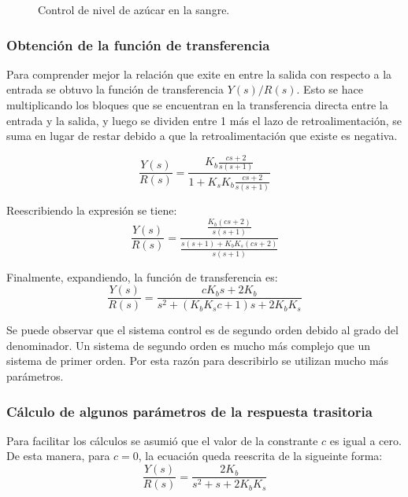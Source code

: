 \documentclass[journal]{IEEEtran}
\begin{document}
\begin{figure}[h]
\caption{Control de nivel de 
az\'ucar en la sangre.}
\label{bloqDiag}
\end{figure}

\subsubsection*{Obtenci\'on de la funci\'on de transferencia}
Para comprender mejor la relaci\'on que exite en entre la
salida con
respecto a la entrada se obtuvo la funci\'on de 
transferencia $Y(s)/R(s)$. Esto se hace multiplicando los
bloques que se encuentran en la transferencia directa entre
la entrada y la salida, y luego se dividen entre 1 m\'as el 
lazo de retroalimentaci\'on, se suma en lugar de restar 
debido a que la retroalimentaci\'on que existe es 
negativa.

\begin{displaymath}
\frac{Y(s)}{R(s)} = \frac{K_b \frac{cs + 2}{s(s + 1)}}{1 + 
K_s K_b \frac{cs + 2}{s(s + 1)}}
\end{displaymath}

Reescribiendo la expresi\'on se tiene: 
\begin{displaymath}
\frac{Y(s)}{R(s)} = \frac{\frac{K_b(cs + 2)}{s(s+1)}}
{\frac{s(s + 1 ) + K_b K_s (cs + 2)}{s(s+1)}}
\end{displaymath}

Finalmente, expandiendo, la funci\'on de transferencia es: 
\begin{equation}
\boxed{
	\frac{Y(s)}{R(s)} = \frac{c K_b s + 2 K_b}
	{s^2 + (K_b K_s c + 1 )s + 2 K_b K_s }
}
\end{equation}

Se puede observar que el sistema control es de segundo orden 
debido al grado del denominador. Un sistema de segundo orden
es mucho m\'as complejo que un sistema de primer orden. Por 
esta raz\'on para describirlo se utilizan mucho m\'as 
par\'ametros. \\


\subsubsection*{C\'alculo de algunos par\'ametros de la 
respuesta trasitoria}
Para facilitar los c\'alculos se asumi\'o que el valor de la
constrante $c$ es igual a cero. De esta manera, para 
$c = 0$, la ecuaci\'on queda reescrita de la sigueinte 
forma: 
\begin{equation}
	\frac{Y(s)}{R(s)} = \frac{2 K_b}
	{s^2 + s + 2 K_b K_s }
	\label{equ_transf}
\end{equation}
\end{document}
